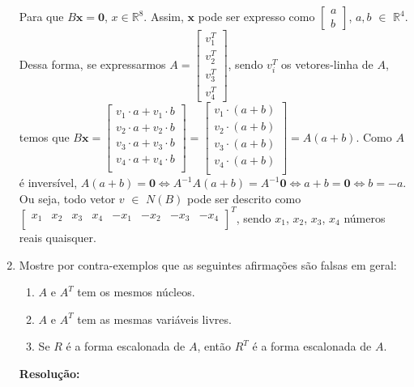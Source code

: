 \documentclass[leqno]{article}
\begin{document}
\begin{enumerate}
    Para que $B\textbf{x}=\textbf{0}$, $x\in \mathbb{R}^8$. Assim, $\textbf{x}$ pode ser expresso como $\begin{bmatrix}
    a\\
    b
    \end{bmatrix}$, $a,b$ $\in$ $\mathbb{R}^4$. Dessa forma, se expressarmos $A=\begin{bmatrix}
    v_1^T\\
    v_2^T\\
    v_3^T\\
    v_4^T
    \end{bmatrix}$, sendo $v_i^T$ os vetores-linha de $A$, temos que $B\textbf{x}=\begin{bmatrix}
    v_1\cdot a +v_1\cdot b\\
    v_2\cdot a +v_2\cdot b\\
    v_3\cdot a +v_3\cdot b\\
    v_4\cdot a +v_4\cdot b\\
    \end{bmatrix}=\begin{bmatrix}
    v_1\cdot( a + b)\\
    v_2\cdot( a + b)\\
    v_3\cdot( a + b)\\
    v_4\cdot( a + b)\\
    \end{bmatrix}=A(a+b)$. Como $A$ é inversível, $A(a+b)=\textbf{0}\iff A^{-1}A(a+b)=A^{-1}\textbf{0}\iff a+b=\textbf{0}\iff b=-a$.
    Ou seja, todo vetor $v$ $\in$ $N(B)$ pode ser descrito como $\begin{bmatrix}
    x_1 & x_2 & x_3 & x_4 & -x_1 & -x_2 & -x_3 & -x_4\\
    \end{bmatrix}^T$, sendo $x_1$, $x_2$, $x_3$, $x_4$ números reais quaisquer.

    \item Mostre por contra-exemplos que as seguintes afirmações são falsas em geral:
    
    \begin{enumerate}
        \item $A$ e $A^T$ tem os mesmos núcleos.
        \item $A$ e $A^T$ tem as mesmas variáveis livres.
        \item Se $R$ é a forma escalonada de $A$, então $R^T$ é a forma escalonada de $A$.
    \end{enumerate}
    
    \textbf{Resolução:}
    

\end{enumerate}
\end{document}
